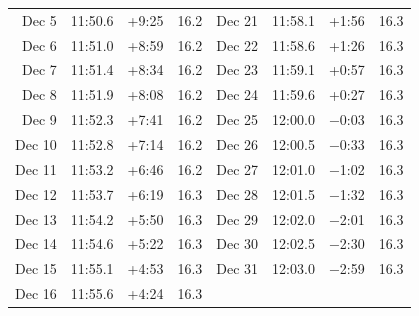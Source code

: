 {\begin{longtable}{r r r r | r r r r}
Dec 5 & 11:50.6 & +9:25 & 16.2 & Dec 21 & 11:58.1 & +1:56 & 16.3 \\
Dec 6 & 11:51.0 & +8:59 & 16.2 & Dec 22 & 11:58.6 & +1:26 & 16.3 \\
Dec 7 & 11:51.4 & +8:34 & 16.2 & Dec 23 & 11:59.1 & +0:57 & 16.3 \\
Dec 8 & 11:51.9 & +8:08 & 16.2 & Dec 24 & 11:59.6 & +0:27 & 16.3 \\
Dec 9 & 11:52.3 & +7:41 & 16.2 & Dec 25 & 12:00.0 & $-$0:03 & 16.3 \\
Dec 10 & 11:52.8 & +7:14 & 16.2 & Dec 26 & 12:00.5 & $-$0:33 & 16.3 \\
Dec 11 & 11:53.2 & +6:46 & 16.2 & Dec 27 & 12:01.0 & $-$1:02 & 16.3 \\
Dec 12 & 11:53.7 & +6:19 & 16.3 & Dec 28 & 12:01.5 & $-$1:32 & 16.3 \\
Dec 13 & 11:54.2 & +5:50 & 16.3 & Dec 29 & 12:02.0 & $-$2:01 & 16.3 \\
Dec 14 & 11:54.6 & +5:22 & 16.3 & Dec 30 & 12:02.5 & $-$2:30 & 16.3 \\
Dec 15 & 11:55.1 & +4:53 & 16.3 & Dec 31 & 12:03.0 & $-$2:59 & 16.3 \\
Dec 16 & 11:55.6 & +4:24 & 16.3 &  & & &  \\
\end{longtable}}
